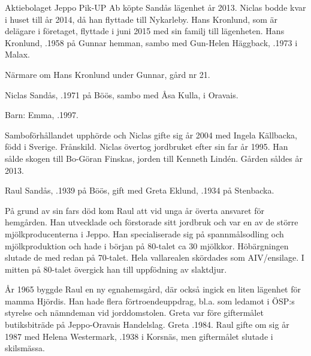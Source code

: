 %
Aktiebolaget Jeppo Pik-UP Ab köpte Sandås lägenhet år 2013. Niclas bodde kvar i huset till år 2014, då han flyttade till Nykarleby. Hans Kronlund, som är delägare i företaget, flyttade i juni 2015 med sin familj till lägenheten. Hans Kronlund, .1958 på Gunnar hemman, sambo med Gun-Helen Häggback, .1973 i Malax.
\begin{jhchildren}
  \item {}
  \item {}
  \item {}
\end{jhchildren}
Närmare om Hans Kronlund under Gunnar, gård nr 21.


%
Niclas Sandås,  .1971 på Böös, sambo med Åsa Kulla,  i Oravais.

Barn: Emma, .1997.

Samboförhållandet upphörde och Niclas gifte sig år 2004 med Ingela Källbacka, född i Sverige. Frånskild. Niclas övertog jordbruket efter sin far år 1995. Han sålde  skogen till Bo-Göran Finskas, jorden till Kenneth Lindén. Gården såldes år 2013.


%
Raul Sandås, .1939 på Böös, gift med Greta Eklund, .1934 på Stenbacka.
\begin{jhchildren}
  \item {}
  \item {}
\end{jhchildren}
På grund av sin fars död kom Raul att vid unga år överta ansvaret för hemgården. Han utvecklade och förstorade sitt jordbruk och var en av de större mjölkproducenterna i Jeppo. Han specialiserade sig på spannmålsodling och mjölkproduktion och hade i början på 80-talet ca 30 mjölkkor. Höbärgningen slutade de med redan på 70-talet. Hela vallarealen skördades som AIV/ensilage. I mitten på 80-talet övergick han till uppfödning av slaktdjur.

År 1965 byggde Raul en ny egnahemsgård, där också ingick en liten lägenhet för mamma Hjördis. Han hade flera förtroendeuppdrag, bl.a. som ledamot i ÖSP:s styrelse och nämndeman vid jorddomstolen. Greta var före giftermålet butiksbiträde på Jeppo-Oravais Handelslag. Greta .1984. Raul gifte om sig år 1987 med Helena Westermark, .1938 i Korsnäs, men giftermålet slutade i skilsmässa.

